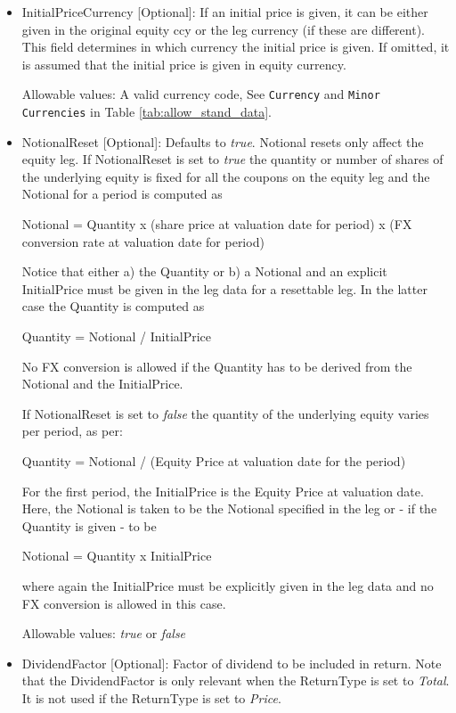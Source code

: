 \begin{itemize}
\item InitialPriceCurrency [Optional]: If an initial price is given, it can be either given in the original equity ccy
  or the leg currency (if these are different). This field determines in which currency the initial price is given. If
  omitted, it is assumed that the initial price is given in equity currency.

Allowable values: A valid currency code, See \lstinline!Currency! and \lstinline!Minor Currencies! in Table \ref{tab:allow_stand_data}.

\item NotionalReset [Optional]: Defaults to \emph{true}.  Notional resets only affect the equity leg. If NotionalReset
  is set to \emph{true} the quantity or number of shares of the underlying equity is fixed for all the coupons on the
  equity leg and the Notional for a period is computed as

  Notional = Quantity x (share price at valuation date for period) x (FX conversion rate at valuation date for period)

  Notice that either a) the Quantity or b) a Notional and an explicit InitialPrice must be given in the leg data for a
  resettable leg. In the latter case the Quantity is computed as

  Quantity = Notional / InitialPrice

  No FX conversion is allowed if the Quantity has to be derived from the Notional and the InitialPrice.

  If NotionalReset is set to \emph{false} the quantity of the underlying equity varies per period, as per:
  
  Quantity = Notional / (Equity Price at valuation date for the period)

For the first period, the InitialPrice is the Equity Price at valuation date.
Here, the Notional is taken to be the Notional specified in the leg or - if the Quantity is given - to be

  Notional = Quantity x InitialPrice

  where again the InitialPrice must be explicitly given in the leg data and no FX conversion is allowed in this case.

  Allowable values:  \emph{true} or  \emph{false}

\item DividendFactor [Optional]: Factor of dividend to be included in return. Note that the DividendFactor is only relevant when the ReturnType is set to  \emph{Total}. It is not used if the ReturnType is set to \emph{Price}.


\end{itemize}
